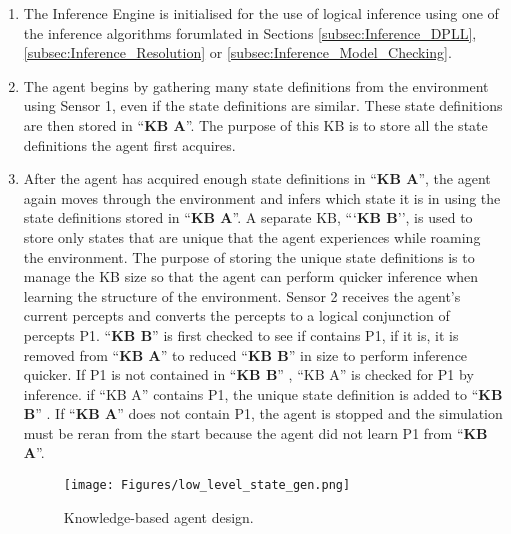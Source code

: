 \begin{enumerate}
\item The Inference Engine is initialised for the use of logical inference using one of the inference algorithms forumlated in Sections \ref{subsec:Inference_DPLL}, \ref{subsec:Inference_Resolution} or \ref{subsec:Inference_Model_Checking}.
 \item The agent begins by gathering many state definitions from the environment using Sensor 1, even if the state definitions are similar. These state definitions are then stored in ``\textbf{KB A}''. The purpose of this KB is to store all the state definitions the agent first acquires.
 \item After the agent has acquired enough state definitions in ``\textbf{KB A}'', the agent again moves through the environment and infers which state it is in using the state definitions stored in ``\textbf{KB A}''. A separate KB, ```\textbf{KB B}'', is used to store only states that are unique that the agent experiences while roaming the environment. The purpose of storing the unique state definitions is to manage the KB size so that the agent can perform quicker inference when learning the structure of the environment. Sensor 2 receives the agent's current percepts and converts the percepts to a logical conjunction of percepts P1. 
``\textbf{KB B}'' is first checked to see if contains P1, if it is, it is removed from ``\textbf{KB A}'' to reduced ``\textbf{KB B}'' in size to perform inference quicker. If P1 is not contained in ``\textbf{KB B}'' , ``KB A'' is checked for P1 by inference. if ``KB A'' contains P1, the unique state definition is added to ``\textbf{KB B}'' . If ``\textbf{KB A}'' does not contain P1, the agent is stopped and the simulation must be reran from the start because the agent did not learn P1 from ``\textbf{KB A}''.

\begin{figure}[H]
    \centering
    \texttt{[image: Figures/low\_level\_state\_gen.png]}
    \caption{Knowledge-based agent design.} 
    \label{fig:agent_design}
\end{figure}


\end{enumerate}
